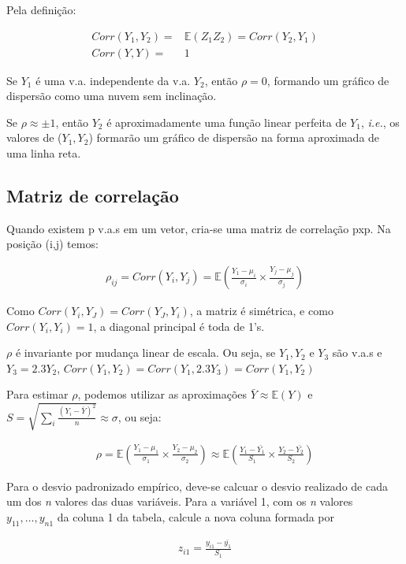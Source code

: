 \documentclass[11pt,a4paper]{article}
\begin{document}
		Pela definição: 
		
		\begin{eqnarray*}
			Corr(Y_1,Y_2)=&\mathbb{E}(Z_1Z_2)=Corr(Y_2,Y_1)\\
			Corr(Y,Y)=&1
		\end{eqnarray*}
		
		Se $Y_1$ é uma v.a. independente da v.a. $Y_2$, então $\rho=0$, formando um gráfico de dispersão como uma nuvem sem inclinação.
		
		Se $\rho\approx\pm 1$, então $Y_2$ é aproximadamente uma função linear perfeita de $Y_1$, \textit{i.e.}, os valores de ($Y_1,Y_2$) formarão  um gráfico de dispersão na forma aproximada de uma linha reta.
		
		\subsection{Matriz de correlação}
		
		Quando existem p v.a.s em um vetor, cria-se uma matriz de correlação pxp.
		Na posição (i,j) temos:
		
		\begin{eqnarray*}
			\rho_{ij}=Corr(Y_i,Y_j)=\mathbb{E}(\frac{Y_1-\mu_i}{\sigma_i}\times\frac{Y_j-\mu_j}{\sigma_j})
		\end{eqnarray*}
		
		Como $Corr(Y_i,Y_J)=Corr(Y_J,Y_i)$, a matriz é simétrica, e como $Corr(Y_i,Y_i)=1$, a diagonal principal é toda de 1's.
		
		$\rho$ é invariante por mudança linear de escala.
		Ou seja, se $Y_1,Y_2$ e $Y_3$ são v.a.s e $Y_3=2.3Y_2$, $Corr(Y_1,Y_2)=Corr(Y_1,2.3Y_3)=Corr(Y_1,Y_2)$
		
		Para estimar $\rho$, podemos utilizar as aproximações $\bar{Y}\approx\mathbb{E}(Y)$ e $S=\sqrt{\sum_i\frac{(Y_i-\bar{Y})^2}{n}}\approx\sigma$, ou seja:
		
		\begin{eqnarray*}
			\rho=\mathbb{E}(\frac{Y_1-\mu_1}{\sigma_1}\times\frac{Y_2-\mu_2}{\sigma_2})\approx\mathbb{E}(\frac{Y_1-\bar{Y_1}}{S_1}\times\frac{Y_2-\bar{Y_2}}{S_2})
		\end{eqnarray*}
		
		Para o desvio padronizado empírico, deve-se calcuar o desvio realizado de cada um dos \textit{n} valores das duas variáveis.
		Para a variável 1, com os \textit{n} valores $y_{11},\ldots,y_{n1}$ da coluna 1 da tabela, calcule a nova coluna formada por
		
		\begin{eqnarray*}
			z_{i1}=\frac{y_{i1}-\bar{y_1}}{S_1}
		\end{eqnarray*}
		
\end{document}
